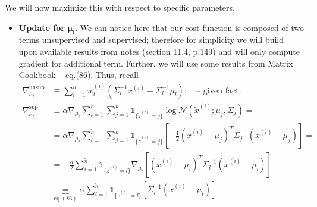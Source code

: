 \documentclass{article}
\begin{document}
\begin{enumerate}[label=(\alph*)]
We will now maximize this with respect to specific parameters.

\begin{itemize}
    \item \textbf{Update for} $\boldsymbol{\mu_l}$. We can notice here that our cost function is composed of two terms unsupervised and supervised; therefore for simplicity we will build upon available results from notes (section 11.4, p.149) and will only compute gradient 
    for additional term. Further, we will use some results from Matrix Cookbook -- eq.(86). Thus, recall
    \begin{align*}
    \nabla_{\mu_l}^\text{unsup} &\equiv \sum_{i=1}^{n}w_l^{(i)}(\Sigma_l^{-1}x^{(i)} - \Sigma_l^{-1}\mu_l);\quad\text{-- given fact.}\\
    \nabla_{\mu_l}^\text{sup} &\equiv \alpha\nabla_{\mu_l} \sum\limits_{i=1}^{\tilde{n}}\sum\limits_{j=1}^{k}\mathds{1}_{\{\tilde{z}^{(i)}=j\}}\log\mathcal{N}(\tilde{x}^{(i)};\mu_j,\Sigma_j) = \\
    &=\alpha\nabla_{\mu_l}\sum_{i=1}^{\tilde{n}} \sum\limits_{j=1}^{k}\mathds{1}_{\{\tilde{z}^{(i)}=j\}}\left[-\frac{1}{2}(\tilde{x}^{(i)} - \mu_j)^T \Sigma_j^{-1} (\tilde{x}^{(i)} - \mu_j)\right]=\\
    & = -\frac{\alpha}{2}\sum_{i=1}^{\tilde{n}}\mathds{1}_{\{\tilde{z}^{(i)}=l\}}\nabla_{\mu_l}\left[(\tilde{x}^{(i)} - \mu_l)^T \Sigma_l^{-1} (\tilde{x}^{(i)} - \mu_l)\right]\\
    &\underbrace{=}_{\text{eq.}(86)} \alpha \sum_{i=1}^{\tilde{n}}\mathds{1}_{\{\tilde{z}^{(i)}=l\}} \left[\Sigma_l^{-1}(\tilde{x}^{(i)} - \mu_l)\right].
    \end{align*}


\end{itemize}
\end{enumerate}
\end{document}
